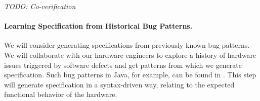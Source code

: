 \documentclass[fleqn,12pt]{article}
\newcommand{\todo}[1]{{\it TODO: #1}}
\begin{document}



\todo{Co-verification}

\paragraph{Learning Specification from Historical Bug Patterns.}
We will consider generating specifications from previously known bug
patterns.  We will collaborate with our hardware engineers to explore
a history of hardware issues triggered by software defects and get
patterns from which we generate specification.  Such bug patterns in
Java, for example, can be found in \cite{web:findbugs_bugs}.  This
step will generate specification in a syntax-driven way, relating to
the expected functional behavior of the hardware.






\end{document}
